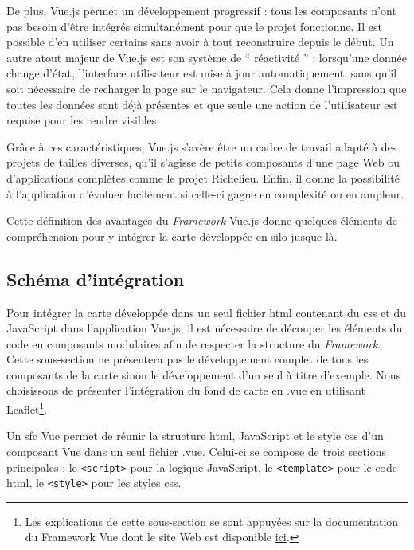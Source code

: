 De plus, Vue.js permet un développement progressif : tous les composants n'ont pas besoin d'être intégrés simultanément pour que le projet fonctionne. Il est possible d'en utiliser certains sans avoir à tout reconstruire depuis le début. Un autre atout majeur de Vue.js est son système de \enquote{ réactivité } : lorsqu'une donnée change d'état, l'interface utilisateur est mise à jour automatiquement, sans qu'il soit nécessaire de recharger la page sur le navigateur. Cela donne l'impression que toutes les données sont déjà présentes et que seule une action de l'utilisateur est requise pour les rendre visibles.

Grâce à ces caractéristiques, Vue.js s'avère être un cadre de travail adapté à des projets de tailles diverses, qu'il s'agisse de petits composants d'une page Web ou d'applications complètes comme le projet Richelieu. Enfin, il donne la possibilité à l'application d'évoluer facilement si celle-ci gagne en complexité ou en ampleur.

Cette définition des avantages du \textit{Framework} Vue.js donne quelques éléments de compréhension pour y intégrer la carte développée en silo jusque-là. 

\subsection{Schéma d'intégration}
Pour intégrer la carte développée dans un seul fichier  \acrshort{html} contenant du  \acrshort{css} et du JavaScript dans l'application Vue.js, il est nécessaire de découper les éléments du code en composants modulaires afin de respecter la structure du \textit{Framework}. Cette sous-section ne présentera pas le développement complet de tous les composants de la carte sinon le développement d'un seul à titre d'exemple. Nous choisissons de présenter l'intégration du fond de carte en .vue en utilisant Leaflet\footnote{Les explications de cette sous-section se sont appuyées sur la documentation du Framework Vue dont le site Web est disponible \href{https://fr.vuejs.org/api/sfc-script-setup}{ici}.}. 

Un  \acrshort{sfc} Vue permet de réunir la structure   \acrshort{html}, JavaScript et le style  \acrshort{css} d'un composant Vue dans un seul fichier .vue.  Celui-ci se compose de trois sections principales  : le \texttt{<script>} pour la logique JavaScript, le \texttt{<template>} pour le code  \acrshort{html}, le \texttt{<style>} pour les styles  \acrshort{css}.

